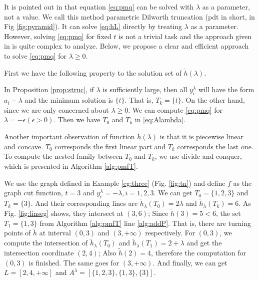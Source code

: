\documentclass{article}
\begin{document}
It is pointed out in \cite{RN4} that equation \eqref{eq:pmq} can be solved with $\lambda$ as a parameter, not a value. We call this method parametric Dilworth truncation (\textsf{pdt} in short, in Fig \ref{fig:pyramid}). It can solve \eqref{eq:hL} directly by treating $\lambda$ as a parameter. However, solving \eqref{eq:pmq} for fixed $t$ is not a trivial task and the approach given in \cite{RN4} is quite complex to analyze. Below, we propose a clear and efficient approach to solve \eqref{eq:pmq} for $\lambda\geq 0$. 

First we have the following property to the solution set of $\tilde{h}(\lambda) $.


In Proposition \ref{prop:struc}, if $\lambda$ is sufficiently large, then all $y_i^{\lambda}$ will have the form $a_i -  \lambda$ and the minimum solution is $\{t\}$. That is, $T_k = \{t\}$. On the other hand, since we are only concerned about $\lambda \geq 0$. We can compute \eqref{eq:pmq} for $\lambda = -\epsilon (\epsilon > 0)$. Then we have $T_0$ and $T_k$ in \eqref{eq:Alambda}.

Another important observation of function $\tilde{h}(\lambda)$ is that it is piecewise linear and concave. $T_0$ corresponds the first linear part and $T_k$ corresponds the last one.  To compute the nested family between $T_0$ and $T_k$, we use divide and conquer, which is presented in Algorithm \ref{alg:pmfT}.


\begin{example}
We use the graph defined in Example \ref{eg:three} (Fig. \ref{fig:tn}) and define $f$ as the graph cut function, $t=3$ and $y^{\lambda}_i = -\lambda, i=1,2,3$. 
We can get $T_0 = \{1,2,3\} $ and $T_k = \{3\}$. And their corresponding lines are $\tilde{h}_{\lambda}(T_0) =2\lambda$ and $\tilde{h}_{\lambda}(T_k)=6$. As Fig. \ref{fig:linseg} shows, they intersect at $(3, 6)$; Since $\tilde{h}(3)=5<6$, the set $T_1=\{1,3\}$ from Algorithm \ref{alg:pmfT} line \ref{alg:addP}. That is, there are turning points of $\tilde{h}$ at interval $(0, 3)$ and $(3, +\infty)$ respectively. For $(0,3)$, we compute the intersection of $\tilde{h}_{\lambda}(T_0)$ and $\tilde{h}_{\lambda}(T_1)=2+\lambda$ and get the intersection coordinate $(2,4)$; Also $\tilde{h}(2)=4$, therefore  the computation for $(0,3)$ is finished. The same goes for $(3, +\infty)$. And finally, we can get $L=[2,4, +\infty]$ and $A^{\lambda} = [\{1,2,3\}, \{1,3\},\{3\}]$.	
\end{example}
\end{document}
